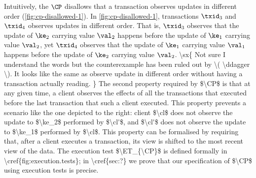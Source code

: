 Intuitively, the \( \CP \) disallows that a transaction observes updates in different order (\cref{fig:cp-disallowed-1}).
In \cref{fig:cp-disallowed-1}, transactions $\txid_{3}$ and \( \txid_4 \) observes updates in different order.
That is, \( \txid_3 \) observes that the update of $\ke_2$ carrying value $\val_2$ happens before the update of $\ke_1$ carrying value $\val_2$,
yet $\txid_{4}$ observes that the update of $\ke_1$ carrying value $\val_1$ happens before the update of $\ke_2$ carrying value $\val_2$. 
\ac{
    \sx{ Not sure I understand the words but the counterexample has  been ruled out by \( \ddagger \). 
         It looks like the same as observe update in different order without having a transaction actually reading. }
The second property required by $\CP$ is that at any given time, 
a client observes the effects of all the transactions that  
executed before the last transaction that such a client executed. 
This property prevents a scenario like the one depicted to the 
right: client $\cl$ does not observe the update to $\ke_2$ performed 
by $\cl'$, and $\cl'$ does not observe the update to $\ke_1$ performed 
by $\cl$. This property can be formalised by requiring that, after 
a client executes a transaction, its view is shifted to the most recent 
view of the data. The execution test $\ET_{\CP}$ is defined formally 
in \cref{fig:execution.tests}; in \cref{sec:?} we prove that our specification  
of $\CP$ using execution tests is precise. 
}



